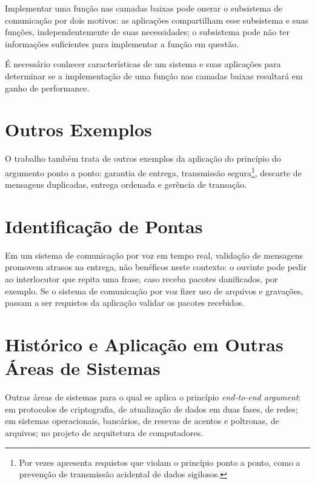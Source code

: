 Implementar uma função nas camadas baixas pode onerar o subsistema de comunicação por dois motivos: as aplicações compartilham esse subsistema e suas funções, independentemente de suas necessidades; o subsistema pode não ter informações suficientes para implementar a função em questão.

É necessário conhecer características de um sistema e suas aplicações para determinar se a implementação de uma função nas camadas baixas resultará em ganho de performance.


\section*{Outros Exemplos}

O trabalho também trata de outros exemplos da aplicação do princípio do argumento ponto a ponto: garantia de entrega, transmissão segura\footnote{Por vezes apresenta requistos que violam o princípio ponto a ponto, como a prevenção de transmissão acidental de dados sigilosos.}, descarte de mensagens duplicadas, entrega ordenada e gerência de transação.


\section*{Identificação de Pontas}

Em um sistema de comunicação por voz em tempo real, validação de mensagens promovem atrasos na entrega, não benéficos neste contexto: o ouvinte pode pedir ao interlocutor que repita uma frase, caso receba pacotes danificados, por exemplo. Se o sistema de comunicação por voz fizer uso de arquivos e gravações, passam a ser requistos da aplicação validar os pacotes recebidos.


\section*{Histórico e Aplicação em Outras Áreas de Sistemas}

Outras áreas de sistemas para o qual se aplica o princípio \textit{end-to-end argument}: em protocolos de criptografia, de atualização de dados em duas fases, de redes; em sistemas operacionais, bancários, de resevas de acentos e poltronas, de arquivos; no projeto de arquitetura de computadores.


